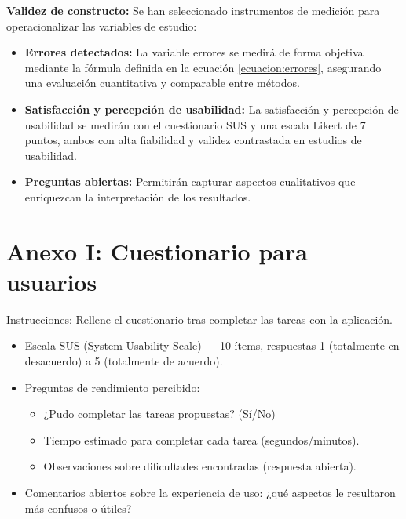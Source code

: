 \documentclass[a4paper,12pt]{report}
\begin{document}
\textbf{Validez de constructo:} Se han seleccionado instrumentos de medición para operacionalizar las variables de estudio: 
\begin{itemize}
    \item \textbf{Errores detectados:} La variable errores se medirá de forma objetiva mediante la fórmula definida en la ecuación \ref{ecuacion:errores}, asegurando una evaluación cuantitativa y comparable entre métodos.
    \item \textbf{Satisfacción y percepción de usabilidad:} La satisfacción y percepción de usabilidad se medirán con el cuestionario SUS y una escala Likert de 7 puntos, ambos con alta fiabilidad y validez contrastada en estudios de usabilidad.
    \item \textbf{Preguntas abiertas:} Permitirán capturar aspectos cualitativos que enriquezcan la interpretación de los resultados.
\end{itemize}

\cleardoublepage

\printbibliography[heading=bibintoc,title={Bibliografía}]
\appendix
\chapter{Anexo I: Cuestionario para usuarios}
\label{anexo:usuarios}

Instrucciones: Rellene el cuestionario tras completar las tareas con la aplicación.

\begin{itemize}
    \item Escala SUS (System Usability Scale) — 10 ítems, respuestas 1 (totalmente en desacuerdo) a 5 (totalmente de acuerdo).
    \item Preguntas de rendimiento percibido:
    \begin{itemize}
        \item ¿Pudo completar las tareas propuestas? (Sí/No)
        \item Tiempo estimado para completar cada tarea (segundos/minutos).
        \item Observaciones sobre dificultades encontradas (respuesta abierta).
    \end{itemize}
    \item Comentarios abiertos sobre la experiencia de uso: ¿qué aspectos le resultaron más confusos o útiles?
\end{itemize}
\end{document}
